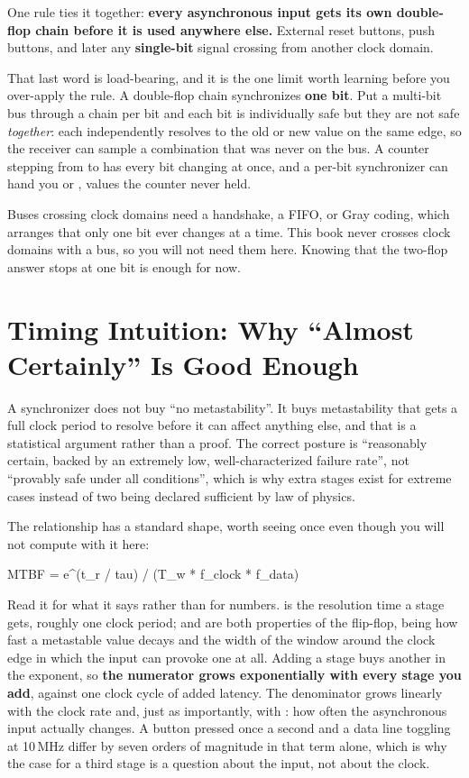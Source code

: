 One rule ties it together: \textbf{every asynchronous input gets its own double-flop chain before
it is used anywhere else.} External reset buttons, push buttons, and later any
\textbf{single-bit} signal crossing from another clock domain.

That last word is load-bearing, and it is the one limit worth learning before you over-apply the
rule. A double-flop chain synchronizes \textbf{one bit}. Put a multi-bit bus through a chain per bit
and each bit is individually safe but they are not safe \emph{together}: each independently
resolves to the old or new value on the same edge, so the receiver can sample a combination that
was never on the bus. A counter stepping from  to  has every bit changing at
once, and a per-bit synchronizer can hand you  or , values the counter never
held.

Buses crossing clock domains need a handshake, a FIFO, or Gray coding, which arranges that only one
bit ever changes at a time. This book never crosses clock domains with a bus, so you will not need
them here. Knowing that the two-flop answer stops at one bit is enough for now.

\section{Timing Intuition: Why ``Almost Certainly'' Is Good Enough}
\label{c4:a4}
A synchronizer does not buy ``no metastability''. It buys metastability that gets a full clock
period to resolve before it can affect anything else, and that is a statistical argument rather
than a proof. The correct posture is ``reasonably certain, backed by an extremely low,
well-characterized failure rate'', not ``provably safe under all conditions'', which is why extra
stages exist for extreme cases instead of two being declared sufficient by law of physics.

The relationship has a standard shape, worth seeing once even though you will not compute with it
here:

\begin{console}
MTBF = e^(t_r / tau) / (T_w * f_clock * f_data)
\end{console}

\noindent Read it for what it says rather than for numbers.  is the resolution time a
stage gets, roughly one clock period;  and  are both properties of the
flip-flop,  being how fast a metastable value decays and  the width of the
window around the clock edge in which the input can provoke one at all. Adding a stage buys another
 in the exponent, so \textbf{the numerator grows exponentially with every stage you add},
against one clock cycle of added latency. The denominator grows linearly with the clock rate and,
just as importantly, with : how often the asynchronous input actually changes. A
button pressed once a second and a data line toggling at 10\,MHz differ by seven orders of magnitude
in that term alone, which is why the case for a third stage is a question about the input, not
about the clock.


